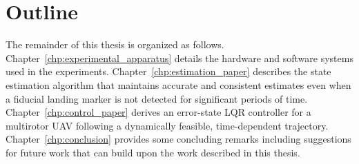 \section{Outline}

The remainder of this thesis is organized as follows.
Chapter~\ref{chp:experimental_apparatus} details the hardware and software
systems used
in the experiments. Chapter~\ref{chp:estimation_paper} describes the state
estimation algorithm that maintains accurate and consistent estimates even when
a fiducial landing marker is not detected for significant periods of time.
Chapter~\ref{chp:control_paper} derives an error-state LQR controller for a
multirotor UAV following a dynamically feasible, time-dependent trajectory.
Chapter~\ref{chp:conclusion} provides some concluding remarks including
suggestions for future work that can build upon the work described in this
thesis.
